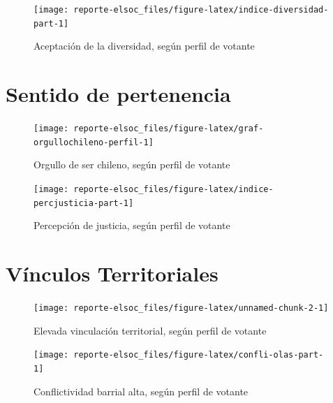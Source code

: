 \documentclass[
  12pt,
]{book}
\begin{document}
\begin{figure}

{\centering \texttt{[image: reporte-elsoc\_files/figure-latex/indice-diversidad-part-1]} 

}

\caption{Aceptación de la diversidad, según perfil de votante}\label{fig:indice-diversidad-part}
\end{figure}

\hypertarget{sentido-de-pertenencia}{%
\section{Sentido de pertenencia}\label{sentido-de-pertenencia}}

\begin{figure}

{\centering \texttt{[image: reporte-elsoc\_files/figure-latex/graf-orgullochileno-perfil-1]} 

}

\caption{Orgullo de ser chileno, según perfil de votante}\label{fig:graf-orgullochileno-perfil}
\end{figure}

\begin{figure}

{\centering \texttt{[image: reporte-elsoc\_files/figure-latex/indice-percjusticia-part-1]} 

}

\caption{Percepción de justicia, según perfil de votante}\label{fig:indice-percjusticia-part}
\end{figure}

\hypertarget{vuxednculos-territoriales}{%
\section{Vínculos Territoriales}\label{vuxednculos-territoriales}}

\begin{figure}

{\centering \texttt{[image: reporte-elsoc\_files/figure-latex/unnamed-chunk-2-1]} 

}

\caption{Elevada vinculación territorial, según perfil de votante}\label{fig:unnamed-chunk-2}
\end{figure}

\begin{figure}

{\centering \texttt{[image: reporte-elsoc\_files/figure-latex/confli-olas-part-1]} 

}

\caption{Conflictividad barrial alta, según perfil de votante}\label{fig:confli-olas-part}
\end{figure}
\end{document}
